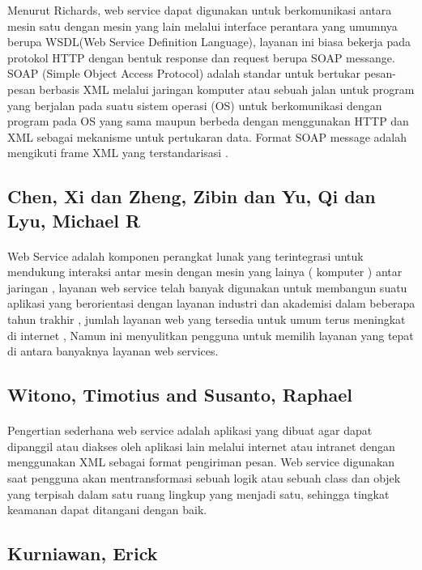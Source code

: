 \documentclass[12pt]{article}
\begin{document}
Menurut Richards, web service dapat digunakan untuk berkomunikasi antara mesin satu dengan mesin yang lain melalui interface perantara yang umumnya berupa WSDL(Web Service Definition Language), layanan ini biasa bekerja pada protokol HTTP dengan bentuk response dan request berupa SOAP messange. SOAP (Simple Object Access Protocol) adalah standar untuk bertukar pesan-pesan berbasis XML melalui jaringan komputer atau sebuah jalan untuk program yang berjalan pada suatu sistem operasi (OS) untuk berkomunikasi dengan program pada OS yang sama maupun berbeda dengan menggunakan HTTP dan XML sebagai mekanisme untuk pertukaran data. Format SOAP message adalah mengikuti frame XML yang terstandarisasi \cite{ihya2011pembuatan}. 

\subsection{Chen, Xi dan Zheng, Zibin dan Yu, Qi dan Lyu, Michael R}
\paragraph{}
Web Service adalah komponen perangkat lunak yang terintegrasi untuk mendukung interaksi antar mesin dengan mesin yang lainya ( komputer ) antar jaringan , layanan web service telah banyak digunakan untuk membangun suatu aplikasi yang berorientasi dengan layanan industri dan akademisi dalam beberapa tahun trakhir , jumlah layanan web yang tersedia untuk umum terus meningkat di internet , Namun  ini menyulitkan pengguna untuk memilih layanan yang tepat di antara banyaknya layanan web services\cite{chen2014web}.

\subsection{Witono, Timotius and Susanto, Raphael}
\paragraph{}
Pengertian sederhana web service adalah aplikasi yang dibuat agar dapat dipanggil atau diakses oleh aplikasi lain melalui internet atau intranet dengan menggunakan XML sebagai format pengiriman pesan. Web service digunakan saat pengguna akan mentransformasi sebuah logik atau sebuah class dan objek yang terpisah dalam satu ruang lingkup yang menjadi satu, sehingga tingkat keamanan dapat ditangani dengan baik\cite{witono201511}.

\subsection{Kurniawan, Erick}
\end{document}
